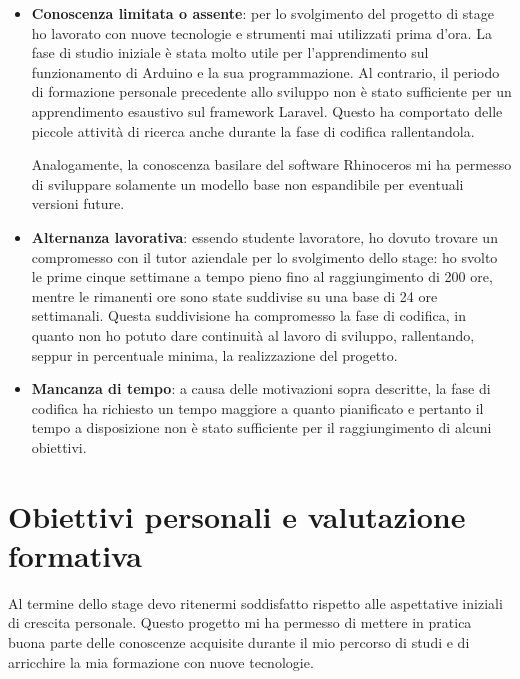 \begin{itemize}
\item \textbf{Conoscenza limitata o assente}: per lo svolgimento del progetto di stage ho lavorato con nuove tecnologie e strumenti mai utilizzati prima d'ora. La fase di studio iniziale è stata molto utile per l'apprendimento sul funzionamento di Arduino e la sua programmazione. Al contrario, il periodo di formazione personale precedente allo sviluppo non è stato sufficiente per un apprendimento esaustivo sul framework Laravel. Questo ha comportato delle piccole attività di ricerca anche durante la fase di codifica rallentandola.

Analogamente, la conoscenza basilare del software Rhinoceros mi ha permesso di sviluppare solamente un modello base non espandibile per eventuali versioni future.
\item \textbf{Alternanza lavorativa}: essendo studente lavoratore, ho dovuto trovare un compromesso con il tutor aziendale per lo svolgimento dello stage: ho svolto le prime cinque settimane a tempo pieno fino al raggiungimento di 200 ore, mentre le rimanenti ore sono state suddivise su una base di 24 ore settimanali. Questa suddivisione ha compromesso la fase di codifica, in quanto non ho potuto dare continuità al lavoro di sviluppo, rallentando, seppur in percentuale minima, la realizzazione del progetto.
\item \textbf{Mancanza di tempo}: a causa delle motivazioni sopra descritte, la fase di codifica ha richiesto un tempo maggiore a quanto pianificato e pertanto il tempo a disposizione non è stato sufficiente per il raggiungimento di alcuni obiettivi.
\end{itemize}

\section{Obiettivi personali e valutazione formativa}
Al termine dello stage devo ritenermi soddisfatto rispetto alle aspettative iniziali di crescita personale. Questo progetto mi ha permesso di mettere in pratica buona parte delle conoscenze acquisite durante il mio percorso di studi e di arricchire la mia formazione con nuove tecnologie.

